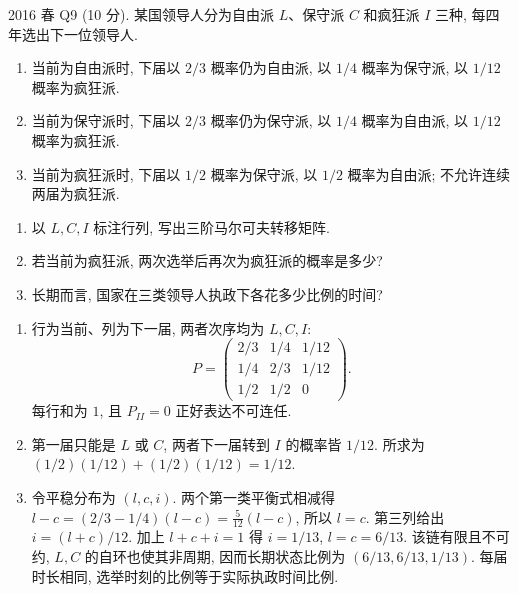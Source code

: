 \begin{exercise}\label{ex:fe2016q9}
2016 春 Q9 (10 分). 某国领导人分为自由派 $L$、保守派 $C$ 和疯狂派 $I$ 三种, 每四年选出下一位领导人.
\begin{enumerate}[label=(\roman*)]
\item 当前为自由派时, 下届以 $2/3$ 概率仍为自由派, 以 $1/4$ 概率为保守派, 以 $1/12$ 概率为疯狂派.
\item 当前为保守派时, 下届以 $2/3$ 概率仍为保守派, 以 $1/4$ 概率为自由派, 以 $1/12$ 概率为疯狂派.
\item 当前为疯狂派时, 下届以 $1/2$ 概率为保守派, 以 $1/2$ 概率为自由派; 不允许连续两届为疯狂派.
\end{enumerate}
\begin{enumerate}[label=(\alph*)]
\item\label{ex:fe2016q9-a} 以 $L,C,I$ 标注行列, 写出三阶马尔可夫转移矩阵.
\item\label{ex:fe2016q9-b} 若当前为疯狂派, 两次选举后再次为疯狂派的概率是多少?
\item\label{ex:fe2016q9-c} 长期而言, 国家在三类领导人执政下各花多少比例的时间?
\end{enumerate}
\end{exercise}
\begin{solution}
\begin{enumerate}[label=(\alph*)]
\item\label{sol:fe2016q9-a} 行为当前、列为下一届, 两者次序均为 $L,C,I$:
\[
 P=\begin{pmatrix}2/3&1/4&1/12\\1/4&2/3&1/12\\1/2&1/2&0\end{pmatrix}.
\]
每行和为 $1$, 且 $P_{II}=0$ 正好表达不可连任.
\item\label{sol:fe2016q9-b} 第一届只能是 $L$ 或 $C$, 两者下一届转到 $I$ 的概率皆 $1/12$. 所求为 $(1/2)(1/12)+(1/2)(1/12)=1/12$.
\item\label{sol:fe2016q9-c} 令平稳分布为 $(l,c,i)$. 两个第一类平衡式相减得
$l-c=(2/3-1/4)(l-c)=\frac5{12}(l-c)$, 所以 $l=c$. 第三列给出 $i=(l+c)/12$. 加上 $l+c+i=1$ 得 $i=1/13$, $l=c=6/13$. 该链有限且不可约, $L,C$ 的自环也使其非周期, 因而长期状态比例为 $(6/13,6/13,1/13)$. 每届时长相同, 选举时刻的比例等于实际执政时间比例.
\end{enumerate}
\end{solution}

